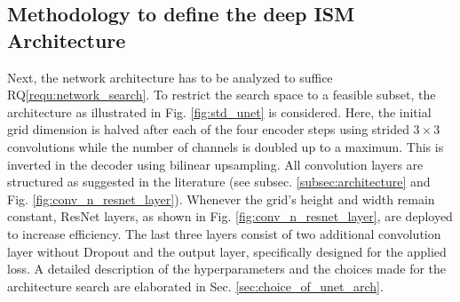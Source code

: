 \subsection{Methodology to define the deep ISM Architecture}
\label{subsec:method_deep_ism_architecture}
Next, the network architecture has to be analyzed to suffice RQ\ref{requ:network_search}. To restrict the search space to a feasible subset, the architecture as illustrated in Fig. \ref{fig:std_unet} is considered. Here, the initial grid dimension is halved after each of the four encoder steps using strided $3\times 3$ convolutions while the number of channels is doubled up to a maximum. This is inverted in the decoder using bilinear upsampling. All convolution layers are structured as suggested in the literature (see subsec. \ref{subsec:architecture} and Fig. \ref{fig:conv_n_resnet_layer}). Whenever the grid's height and width remain constant, ResNet layers, as shown in Fig. \ref{fig:conv_n_resnet_layer}, are deployed to increase efficiency. The last three layers consist of two additional convolution layer without Dropout and the output layer, specifically designed for the applied loss. A detailed description of the hyperparameters and the choices made for the architecture search are elaborated in Sec. \ref{sec:choice_of_unet_arch}.
